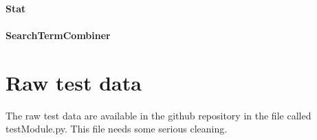 \subsubsection{Stat}

\subsubsection{SearchTermCombiner}


\chapter{Raw test data}

The raw test data are available in the github repository in the file
called testModule.py. This file needs some serious cleaning.

